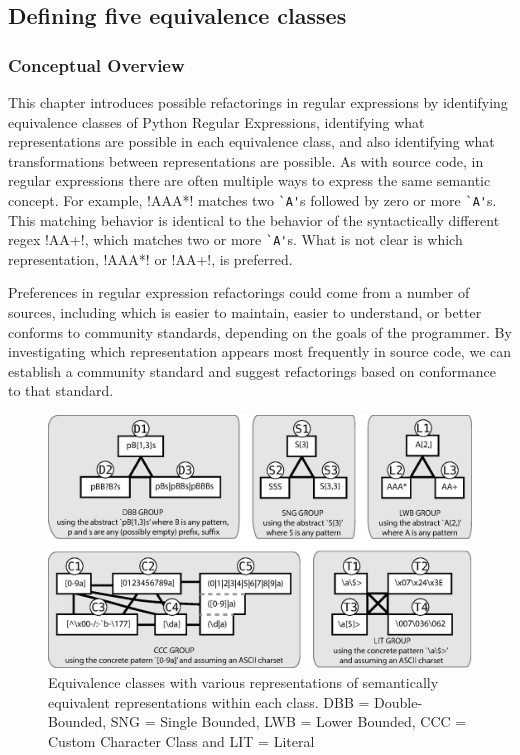 \subsection{Defining five equivalence classes}
\label{sec:equivClasses}

\subsubsection{Conceptual Overview}
This chapter introduces possible refactorings in regular expressions by identifying equivalence classes of Python Regular Expressions, identifying what representations are possible in each equivalence class, and also identifying what transformations between representations are possible. As with source code, in regular expressions there are often multiple ways to express the same semantic concept.
For example, \cverb!AAA*! matches two \verb!`A'!s followed by zero or more \verb!`A'!s.  This matching behavior is identical to the behavior of the syntactically different regex \cverb!AA+!, which matches two or more \verb!`A'!s.  What is not clear is which representation,  \cverb!AAA*!  or  \cverb!AA+!, is preferred.

Preferences in regular expression refactorings could come from a number of sources, including which is easier to maintain, easier to understand, or better conforms to community standards, depending on the goals of the programmer.  By investigating which representation appears most frequently in source code, we can establish a community standard and suggest refactorings based on conformance to that standard.


\begin{figure}[tb]
\centering
\includegraphics[width=\textwidth]{nontex/illustrations/refactoringTree.eps}
\vspace{-12pt}
\caption{Equivalence classes with various representations of semantically equivalent representations within each class. DBB = Double-Bounded, SNG = Single Bounded, LWB = Lower Bounded, CCC = Custom Character Class and LIT = Literal}
\vspace{-6pt}
\label{fig:refactoringTree}
\end{figure}

